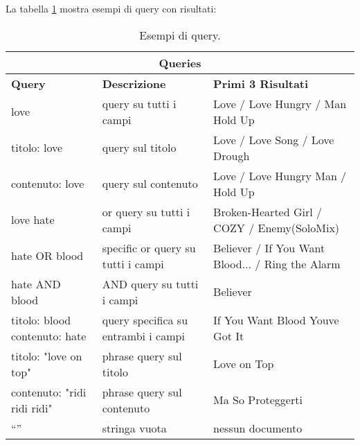 \documentclass[12pt, letterpaper]{article}
\begin{document}
\begin{center}
    La tabella \ref{table:data} mostra esempi di query con risultati:
\begin{table}[h!]
\begin{tabular}{ |p{3cm}|p{5cm}|p{5cm}|  }
\hline
\multicolumn{3}{|c|}{\textbf{Queries}} \\
\hline
 \hline
\textbf{Query} & \textbf{Descrizione} & \textbf{Primi 3 Risultati}\\[1ex]
 \hline\hline
 love & query su tutti i campi & Love / Love Hungry / Man Hold Up\\ 
 titolo: love & query sul titolo & Love / Love Song / Love Drough\\
 contenuto: love & query sul contenuto & Love / Love Hungry Man / Hold Up\\
    love hate & or query su tutti i campi & Broken-Hearted Girl / COZY / Enemy(SoloMix)  \\
 hate OR blood & specific or query su tutti i campi & Believer / If You Want Blood...  / Ring the Alarm  \\
 hate AND blood & AND query su tutti i campi & Believer\\
 titolo: blood contenuto: hate & query specifica su entrambi i campi & If You Want Blood  Youve Got It  \\
 titolo: "love on top" & phrase query sul titolo & Love on Top\\
 contenuto: "ridi ridi ridi" & phrase query sul contenuto & Ma So Proteggerti\\
 “” & stringa vuota & nessun documento \\
 \hline
\end{tabular}
\caption{Esempi di query.}
\label{table:data}
\end{table}
\end{center}
\end{document}
